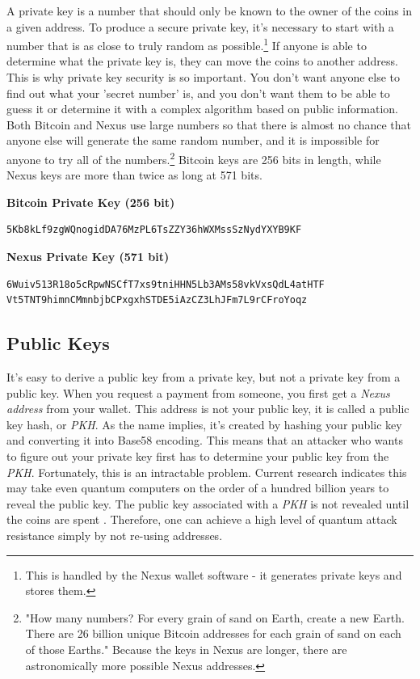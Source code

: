\documentclass[11pt]{article}
\begin{document}
A private key is a number that should only be known to the owner of the coins in a given address.
To produce a secure private key, it's necessary to start with a number that is as close to truly random as possible.\footnote{This is handled by the Nexus wallet software - it generates private keys and stores them.}
If anyone is able to determine what the private key is, they can move the coins to another address.
This is why private key security is so important.
You don't want anyone else to find out what your 'secret number' is, 
and you don't want them to be able to guess it or determine it with a complex algorithm based on public information.
Both Bitcoin and Nexus use large numbers so that there is almost no chance that anyone else will generate the same random number, and it is impossible for anyone to try all of the numbers.\footnote{"How many numbers? For every grain of sand on Earth, create a new Earth. There are 26 billion unique Bitcoin addresses for each grain of sand on each of those Earths."\cite{weusesand} Because the keys in Nexus are longer, there are astronomically more possible Nexus addresses.}
Bitcoin keys are 256 bits in length, while Nexus keys are more than twice as long at 571 bits.

\bigskip
\textbf{Bitcoin Private Key (256 bit)}
\begin{lstlisting}
5Kb8kLf9zgWQnogidDA76MzPL6TsZZY36hWXMssSzNydYXYB9KF
\end{lstlisting}

\bigskip
\textbf{Nexus Private Key (571 bit)}
\begin{lstlisting}
6Wuiv513R18o5cRpwNSCfT7xs9tniHHN5Lb3AMs58vkVxsQdL4atHTF
Vt5TNT9himnCMmnbjbCPxgxhSTDE5iAzCZ3LhJFm7L9rCFroYoqz
\end{lstlisting}

\subsection{Public Keys}

It's easy to derive a public key from a private key, but not a private key from a public key.
When you request a payment from someone, you first get a \textit{Nexus address} from your wallet.
This address is not your public key, it is called a public key hash, or \textit{PKH}.
As the name implies, it's created by hashing your public key and converting it into Base58 encoding.
This means that an attacker who wants to figure out your private key first has to determine your public key from the \textit{PKH}.
Fortunately, this is an intractable problem. Current research indicates this may take even quantum computers on the order of a hundred billion years \cite{registersha3,cryptosha3} to reveal the public key.
The public key associated with a \textit{PKH} is not revealed until the coins are spent \cite{bitcorepkh}.
Therefore, one can achieve a high level of quantum attack resistance simply by not re-using addresses.\\
\end{document}
